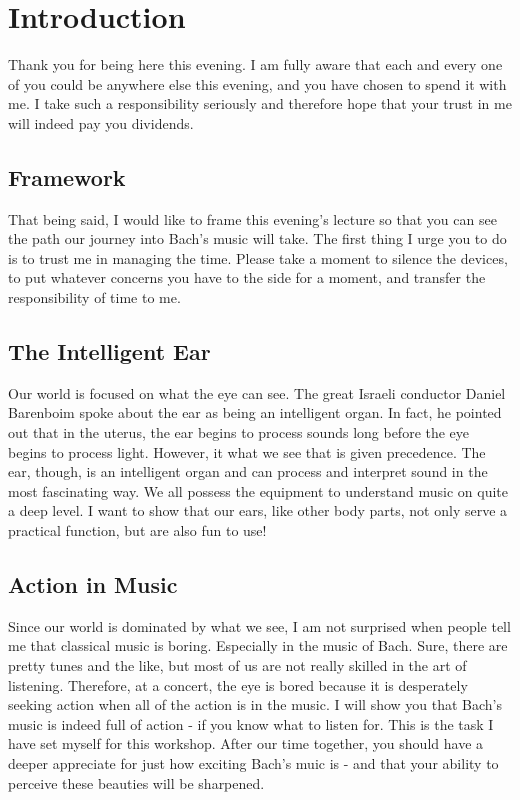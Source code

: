 
\chapter{Introduction}

Thank you for being here this evening. I am fully aware that each and every one of you could be anywhere else this evening, and you have chosen to spend it with me. I take such a responsibility seriously and therefore hope that your trust in me will indeed pay you dividends.

\section{Framework}
That being said, I would like to frame this evening's lecture so that you can see the path our journey into Bach's music will take. The first thing I urge you to do is to trust me in managing the time. Please take a moment to silence the devices, to put whatever concerns you have to the side for a moment, and transfer the responsibility of time to me.

\section{The Intelligent Ear}
Our world is focused on what the eye can see. The great Israeli conductor Daniel Barenboim spoke about the ear as being an intelligent organ. In fact, he pointed out that in the uterus, the ear begins to process sounds long before the eye begins to process light. However, it what we see that is given precedence. The ear, though, is an intelligent organ and can process and interpret sound in the most fascinating way. We all possess the equipment to understand music on quite a deep level. I want to show that our ears, like other body parts, not only serve a practical function, but are also fun to use!

\section{Action in Music}
Since our world is dominated by what we see, I am not surprised when people tell me that classical music is boring. Especially in the music of Bach. Sure, there are pretty tunes and the like, but most of us are not really skilled in the art of listening. Therefore, at a concert, the eye is bored because it is desperately seeking action when all of the action is in the music. I will show you that Bach's music is indeed full of action - if you know what to listen for. This is the task I have set myself for this workshop. After our time together, you should have a deeper appreciate for just how exciting Bach's muic is - and that your ability to perceive these beauties will be sharpened.